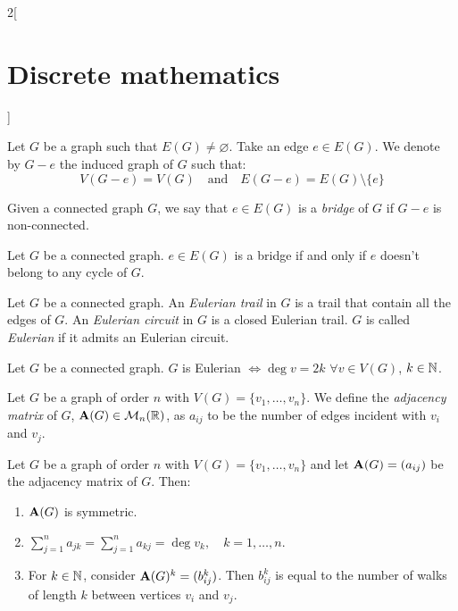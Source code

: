 \documentclass[../../../main_math.tex]{subfiles}
\begin{document}
\begin{multicols}{2}[\section{Discrete mathematics}]
\begin{center}
\begin{minipage}{\linewidth}
    \end{minipage}
  \end{center}
  \begin{definition}
    Let $G$ be a graph such that $E(G)\ne\varnothing$. Take an edge $e\in E(G)$. We denote by $G-e$ the induced graph of $G$ such that: $$V(G-e)=V(G)\quad\text{and}\quad E(G-e)=E(G)\setminus\{e\}$$
  \end{definition}
  \begin{definition}
    Given a connected graph $G$, we say that $e\in E(G)$ is a \emph{bridge} of $G$ if $G-e$ is non-connected.
  \end{definition}
  \begin{proposition}
    Let $G$ be a connected graph. $e\in E(G)$ is a bridge if and only if $e$ doesn't belong to any cycle of $G$.
  \end{proposition}
  \begin{definition}
    Let $G$ be a connected graph. An \emph{Eulerian trail} in $G$ is a trail that contain all the edges of $G$. An \emph{Eulerian circuit} in $G$ is a closed Eulerian trail. $G$ is called \emph{Eulerian} if it admits an Eulerian circuit.
  \end{definition}
  \begin{theorem}
    Let $G$ be a connected graph. $G$ is Eulerian $\iff\deg v=2k$ $\forall v\in V(G)$, $k\in\mathbb{N} $.
  \end{theorem}
  \begin{definition}
    Let $G$ be a graph of order $n$ with $V(G)=\{v_1,\ldots,v_n\}$. We define the \emph{adjacency matrix} of $G$, $\boldsymbol{\mathrm{A}}(G)\in\mathcal{M}_n(\mathbb{R} )$, as $a_{ij}$ to be the number of edges incident with $v_i$ and $v_j$.
  \end{definition}
  \begin{proposition}
    Let $G$ be a graph of order $n$ with $V(G)=\{v_1,\ldots,v_n\}$ and let $\boldsymbol{\mathrm{A}}(G)=(a_{ij})$ be the adjacency matrix of $G$. Then:
    \begin{enumerate}
      \item $\boldsymbol{\mathrm{A}}(G)$ is symmetric.
      \item $\displaystyle\sum_{j=1}^n a_{jk}=\sum_{j=1}^n a_{kj}=\deg v_k,\quad k=1,\ldots,n$.
      \item For $k\in\mathbb{N} $, consider $\boldsymbol{\mathrm{A}}(G)^k=(b_{ij}^k)$. Then $b_{ij}^k$ is equal to the number of walks of length $k$ between vertices $v_i$ and $v_j$.
    \end{enumerate}
  \end{proposition}

\end{multicols}
\end{document}
